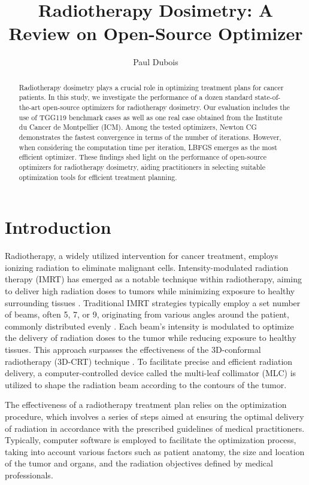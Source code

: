 \documentclass[a4paper]{article}
\title{Radiotherapy Dosimetry: A Review on Open-Source Optimizer}
\author{Paul Dubois}
\begin{document}
	
	\maketitle
	
	\begin{abstract}
		Radiotherapy dosimetry plays a crucial role in optimizing treatment plans for cancer patients.
		In this study, we investigate the performance of a dozen standard state-of-the-art open-source optimizers for radiotherapy dosimetry.
		Our evaluation includes the use of TGG119 benchmark cases as well as one real case obtained from the Institute du Cancer de Montpellier (ICM).
		Among the tested optimizers, Newton CG demonstrates the fastest convergence in terms of the number of iterations.
		However, when considering the computation time per iteration, LBFGS emerges as the most efficient optimizer.
		These findings shed light on the performance of open-source optimizers for radiotherapy dosimetry, aiding practitioners in selecting suitable optimization tools for efficient treatment planning.
	\end{abstract}
	
	\section{Introduction}
	Radiotherapy, a widely utilized intervention for cancer treatment, employs ionizing radiation to eliminate malignant cells.
	Intensity-modulated radiation therapy (IMRT) has emerged as a notable technique within radiotherapy, aiming to deliver high radiation doses to tumors while minimizing exposure to healthy surrounding tissues \cite{ReportIMRT2003}.
	Traditional IMRT strategies typically employ a set number of beams, often 5, 7, or 9, originating from various angles around the patient, commonly distributed evenly \cite{Bortfeld_2006}.
	Each beam's intensity is modulated to optimize the delivery of radiation doses to the tumor while reducing exposure to healthy tissues.
	This approach surpasses the effectiveness of the 3D-conformal radiotherapy (3D-CRT) technique \cite{KOLE2012} \cite{PALMA2008} \cite{VERHEY1999}.
	To facilitate precise and efficient radiation delivery, a computer-controlled device called the multi-leaf collimator (MLC) is utilized to shape the radiation beam according to the contours of the tumor.
	
	The effectiveness of a radiotherapy treatment plan relies on the optimization procedure, which involves a series of steps aimed at ensuring the optimal delivery of radiation in accordance with the prescribed guidelines of medical practitioners.
	Typically, computer software is employed to facilitate the optimization process, taking into account various factors such as patient anatomy, the size and location of the tumor and organs, and the radiation objectives defined by medical professionals.
	
\end{document}
